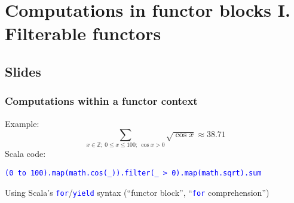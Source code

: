 
\chapter{Computations in functor blocks I. Filterable functors}

\section{Slides}

\subsection{Computations within a functor context}

Example: 
\[
\sum_{x\in\mathbb{Z};\:0\leq x\leq100;\:\cos x>0}\sqrt{\cos x}\approx38.71
\]
Scala code:

\texttt{\textcolor{blue}{\footnotesize{}(0 to 100).map(math.cos(\_)).filter(\_
> 0).map(math.sqrt).sum}}{\footnotesize\par}

Using Scala's \texttt{\textcolor{blue}{\footnotesize{}for}}/\texttt{\textcolor{blue}{\footnotesize{}yield}}
syntax (``functor block'', ``\texttt{\textcolor{blue}{\footnotesize{}for}}
comprehension'')

